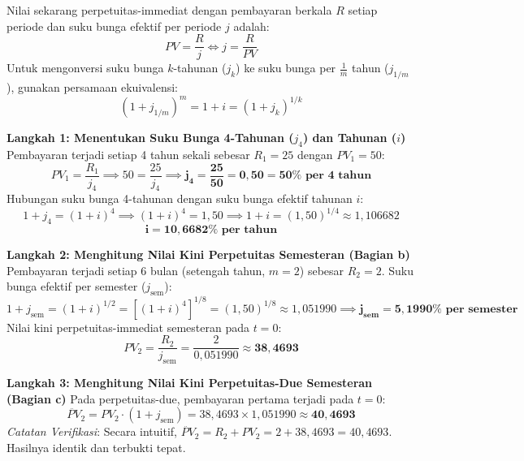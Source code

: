 \documentclass[11pt,a4paper]{article}
\begin{document}
\begin{solusibox}[3]
\begin{konsepbox}
Nilai sekarang perpetuitas-immediat dengan pembayaran berkala $R$ setiap periode dan suku bunga efektif per periode $j$ adalah:
$$PV = \frac{R}{j} \iff j = \frac{R}{PV}$$
Untuk mengonversi suku bunga $k$-tahunan ($j_k$) ke suku bunga per $\frac{1}{m}$ tahun ($j_{1/m}$), gunakan persamaan ekuivalensi:
$$(1 + j_{1/m})^m = 1 + i = (1 + j_k)^{1/k}$$
\end{konsepbox}

\textbf{Langkah 1: Menentukan Suku Bunga 4-Tahunan ($j_4$) dan Tahunan ($i$)}  
Pembayaran terjadi setiap 4 tahun sekali sebesar $R_1 = 25$ dengan $PV_1 = 50$:
$$PV_1 = \frac{R_1}{j_4} \implies 50 = \frac{25}{j_4} \implies \mathbf{j_4 = \frac{25}{50} = 0{,}50 = 50\% \text{ per 4 tahun}}$$
Hubungan suku bunga 4-tahunan dengan suku bunga efektif tahunan $i$:
$$1 + j_4 = (1 + i)^4 \implies (1 + i)^4 = 1{,}50 \implies 1 + i = (1{,}50)^{1/4} \approx 1{,}106682$$
$$\mathbf{i = 10{,}6682\% \text{ per tahun}}$$

\textbf{Langkah 2: Menghitung Nilai Kini Perpetuitas Semesteran (Bagian b)}  
Pembayaran terjadi setiap 6 bulan (setengah tahun, $m=2$) sebesar $R_2 = 2$.  
Suku bunga efektif per semester ($j_{\text{sem}}$):
$$1 + j_{\text{sem}} = (1 + i)^{1/2} = \left[(1 + i)^4\right]^{1/8} = (1{,}50)^{1/8} \approx 1{,}051990 \implies \mathbf{j_{\text{sem}} = 5{,}1990\% \text{ per semester}}$$
Nilai kini perpetuitas-immediat semesteran pada $t=0$:
$$PV_2 = \frac{R_2}{j_{\text{sem}}} = \frac{2}{0{,}051990} \approx \mathbf{38{,}4693}$$

\textbf{Langkah 3: Menghitung Nilai Kini Perpetuitas-Due Semesteran (Bagian c)}  
Pada perpetuitas-due, pembayaran pertama terjadi pada $t=0$:
$$\ddot{PV}_2 = PV_2 \cdot (1 + j_{\text{sem}}) = 38{,}4693 \times 1{,}051990 \approx \mathbf{40{,}4693}$$
\textit{Catatan Verifikasi}: Secara intuitif, $\ddot{PV}_2 = R_2 + PV_2 = 2 + 38{,}4693 = 40{,}4693$. Hasilnya identik dan terbukti tepat.
\end{solusibox}
\end{document}
